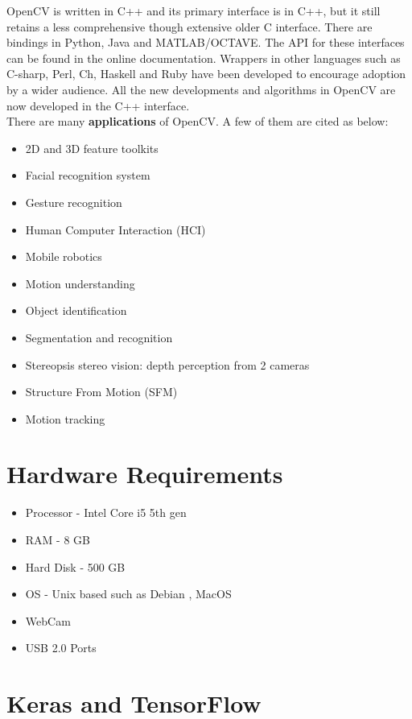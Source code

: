 OpenCV is written in C++ and its primary interface is in C++, but it still retains a less comprehensive though extensive older C interface. There are bindings in Python, Java and MATLAB/OCTAVE. The API for these interfaces	can be found in the online documentation. Wrappers in other languages such as C-sharp, Perl, Ch, Haskell and Ruby have been developed to encourage adoption by a wider audience. All the new developments and algorithms in OpenCV are now developed in the C++ interface.\\
There are many \textbf{applications} of OpenCV. A few of them are cited as below:
\begin{itemize}
\item 2D and 3D feature toolkits 
\item Facial recognition system 
\item Gesture recognition 
\item Human Computer Interaction (HCI) 
\item Mobile robotics 
\item Motion understanding 
\item Object identification 
\item Segmentation and recognition 
\item Stereopsis stereo vision: depth perception from 2 cameras 
\item Structure From Motion (SFM) 
\item Motion tracking 
\end{itemize}
\section{Hardware Requirements}
\begin{itemize}
	\item Processor - Intel Core i5 5th gen
	\item RAM - 8 GB
	\item Hard Disk - 500 GB
	\item OS - Unix based such as Debian , MacOS
	\item WebCam
	\item USB 2.0 Ports
\end{itemize}
\section{Keras and TensorFlow}
